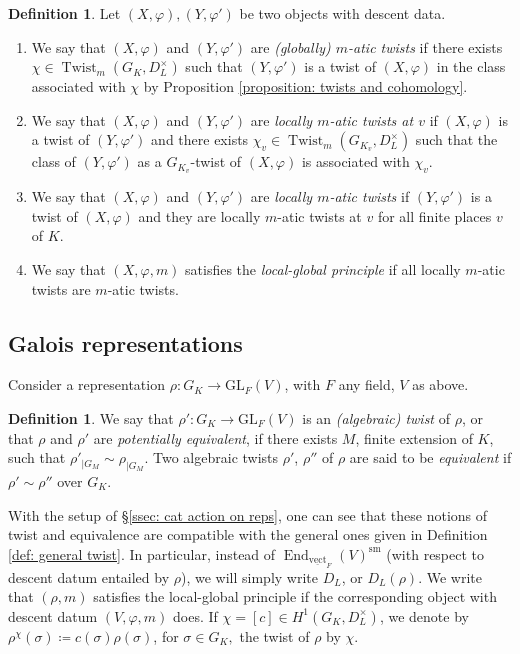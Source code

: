 \documentclass[a4paper,10pt]{amsart}
\theoremstyle{plain}
\theoremstyle{definition}
\newtheorem{definition}[theorem]{Definition}
\theoremstyle{remark}
\def\GL{\mathrm{GL}}
\def\mr#1{\mathrm{#1}}
\def\vect{\underline{\mathrm{vect}}}
\newcommand{\bD}{D_L}
\DeclareMathOperator{\End}{End}
\DeclareMathOperator{\Twist}{Twist}
\begin{document}
\begin{definition}\label{def-local-global-I}
Let \((X, \varphi), (Y, \varphi')\) be two objects with descent data.
\begin{enumerate}
\item We say that \((X, \varphi)\) and \((Y, \varphi')\) are \emph{(globally) \(m\)-atic twists} if there exists \(\chi \in \Twist_m(G_K, \bD^\times)\) such that \((Y, \varphi')\) is a twist of \((X, \varphi)\) in the class associated with \(\chi\) by Proposition \ref{proposition: twists and cohomology}. 
\item We say that \((X, \varphi)\) and \((Y, \varphi')\) are \emph{locally \(m\)-atic twists at \(v\)} if \((X, \varphi)\) is a twist of \((Y, \varphi')\) and there exists \(\chi_v \in \Twist_{m}(G_{K_v}, \bD^\times)\) such that the class of \((Y, \varphi')\) as a \(G_{K_v}\)-twist of \((X, \varphi)\) is associated with \(\chi_v\). 
\item We say that \((X, \varphi)\) and \((Y, \varphi')\) are \emph{locally \(m\)-atic twists} if \((Y, \varphi')\) is a twist of \((X, \varphi)\) and they are locally \(m\)-atic twists at \(v\) for all finite places \(v\) of \(K\).
\item We say that \((X, \varphi, m)\) satisfies the \emph{local-global principle} if all locally \(m\)-atic twists are \(m\)-atic twists.
\end{enumerate}
\end{definition}


\subsection{Galois representations}\label{sec: twist of a rep}
Consider a representation \(\rho: G_K \to \GL_F(V)\), with \(F\) any field, \(V\) as above. 
\begin{definition}
We say that \(\rho' \colon G_K \to \GL_F(V)\) is an \emph{(algebraic) twist} of \(\rho\), or that \(\rho\) and \(\rho'\) are \emph{potentially equivalent}, if there exists \(M\), finite extension of \(K\), such that \(\rho'_{|G_M} \sim \rho_{|G_M}\). Two algebraic twists \(\rho'\), \(\rho''\) of \(\rho\) are said to be \emph{equivalent} if \(\rho' \sim \rho''\) over \(G_K\).
\end{definition}

With the setup of \S\ref{ssec: cat action on reps}, one can see that these notions of twist and equivalence are compatible with the general ones given in Definition \ref{def: general twist}. In particular, instead of \(\End_{\vect_F}(V)^\mr{sm}\) (with respect to descent datum entailed by \(\rho\)), we will simply write \(\bD\), or \(\bD(\rho)\). We write that \((\rho, m)\) satisfies the local-global principle if the corresponding object with descent datum \((V, \varphi, m)\) does.
If \(\chi = [c] \in H^1(G_K, D_L^\times)\), we denote by \(\rho^\chi(\sigma) \coloneqq c(\sigma)\rho(\sigma)\), for \(\sigma \in G_K,\) the twist of \(\rho\) by \(\chi\).
\end{document}

